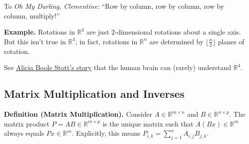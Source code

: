 \begin{remark}
    To \emph{Oh My Darling, Clementine:} ``Row by column, row by column, row by column, multiply!''
\end{remark}


\textbf{Example.} Rotations in $\mathbb{R}^3$ are just $2$-dimensional rotations about a single axis.  But this isn't true in $\mathbb{R}^4$; in fact, rotations in $\mathbb{R}^n$ are determined by $\lfloor \tfrac{n}{2} \rfloor$ planes of rotation.

\begin{remark}
See \href{https://en.wikipedia.org/wiki/Alicia_Boole_Stott}{\underline{Alicia Boole Stott's story}} that the human brain can (rarely) understand $\mathbb{R}^4$.
\end{remark}

\subsection{Matrix Multiplication and Inverses}

\textbf{Definition (Matrix Multiplication).} Consider $A \in \mathbb{R}^{m \times n}$ and $B \in \mathbb{R}^{n \times p}$.  The matrix product $P = AB \in \mathbb{R}^{m \times p}$ is the unique matrix such that $A(Bx) \in \mathbb{R}^m$ always equals $Px \in \mathbb{R}^m$.  Explicitly, this means $\displaystyle P_{i, k} = \sum_{j = 1}^n A_{i, j} B_{j, k}$.

